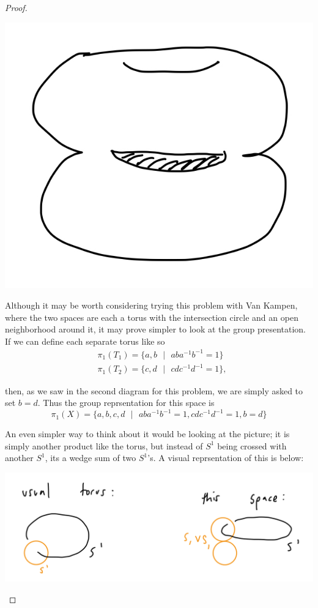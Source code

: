 \documentclass[12pt]{article}
\begin{document}
\begin{proof}
  \par \begin{center} \includegraphics[scale=.2]{4-5.jpg} \end{center} 
  \par Although it may be worth considering trying this problem with Van Kampen, where the two spaces are each a torus with the intersection circle and an open neighborhood around it, it 
  may prove simpler to look at the group presentation. If we can define each separate torus like so 
  \begin{align*}
    & \pi_1(T_1) = \{a,b \text{ }|\text{ } aba^{-1}b^{-1} = 1\} \\
    & \pi_1(T_2) = \{c,d \text{ }|\text{ } cdc^{-1}d^{-1} = 1\},
  \end{align*}
  \par then, as we saw in the second diagram for this problem, we are simply asked to set $b=d$. Thus the group reprsentation for this space is 
  \begin{equation*}
    \pi_1(X) = \{a,b,c,d \text{ }|\text{ } aba^{-1}b^{-1} =1, cdc^{-1}d^{-1} = 1, b=d \}
  \end{equation*}
  \par An even simpler way to think about it would be looking at the picture; it is simply another product like the torus, but 
  instead of $S^1$ being crossed with another $S^1$, its a wedge sum of two $S^1$'s. A visual reprsentation of this is below: 
  \par \begin{center} \includegraphics[scale=.2]{4-6.png} \end{center} 

\end{proof}
\end{document}
